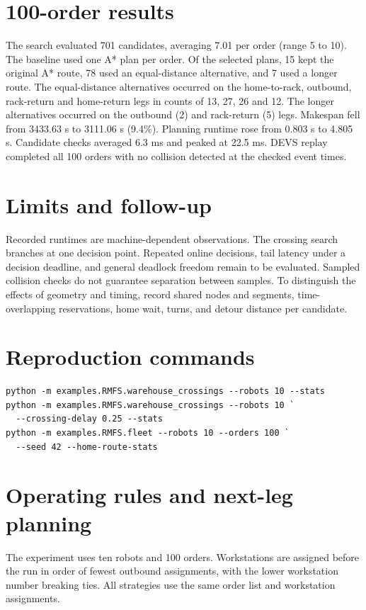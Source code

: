 \documentclass[11pt]{article}
\begin{document}
\section{100-order results}
The search evaluated 701 candidates, averaging 7.01 per order (range 5 to 10). The baseline used one A* plan per order. Of the selected plans, 15 kept the original A* route, 78 used an equal-distance alternative, and 7 used a longer route. The equal-distance alternatives occurred on the home-to-rack, outbound, rack-return and home-return legs in counts of 13, 27, 26 and 12. The longer alternatives occurred on the outbound (2) and rack-return (5) legs. Makespan fell from 3433.63 s to 3111.06 s (9.4\%). Planning runtime rose from 0.803 s to 4.805 s. Candidate checks averaged 6.3 ms and peaked at 22.5 ms. DEVS replay completed all 100 orders with no collision detected at the checked event times.

\section{Limits and follow-up}
Recorded runtimes are machine-dependent observations. The crossing search branches at one decision point. Repeated online decisions, tail latency under a decision deadline, and general deadlock freedom remain to be evaluated. Sampled collision checks do not guarantee separation between samples. To distinguish the effects of geometry and timing, record shared nodes and segments, time-overlapping reservations, home wait, turns, and detour distance per candidate.

\section{Reproduction commands}
{\small
\begin{verbatim}
python -m examples.RMFS.warehouse_crossings --robots 10 --stats
python -m examples.RMFS.warehouse_crossings --robots 10 `
  --crossing-delay 0.25 --stats
python -m examples.RMFS.fleet --robots 10 --orders 100 `
  --seed 42 --home-route-stats
\end{verbatim}
}

\section{Operating rules and next-leg planning}
The experiment uses ten robots and 100 orders. Workstations are assigned before the run in order of fewest outbound assignments, with the lower workstation number breaking ties. All strategies use the same order list and workstation assignments.
\end{document}

